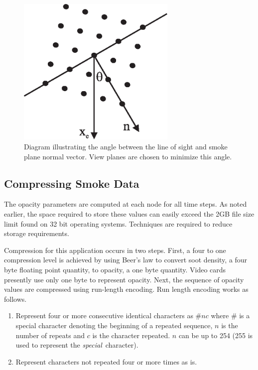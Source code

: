 \documentclass[11pt,twoside]{book}
\begin{document}
\begin{figure}
\centerline{\includegraphics[width=3.0in]{figures/figDIRB}}
\caption{Diagram illustrating the angle between the line of sight
and smoke plane normal vector.  View planes are chosen to minimize
this angle.} \label{figDIRB}
\end{figure}

%
%

\subsection{Compressing Smoke Data}

The opacity parameters are computed at each node for all time
steps. As noted earlier, the space required to store these values can easily exceed the 2GB file size limit found on 32
bit operating systems.
Techniques are required to reduce storage requirements.

Compression for this application occurs in two steps.  First, a four to one compression level is achieved by using Beer's
law to convert soot density, a four byte floating point quantity, to opacity, a one byte quantity.  Video cards presently use only one byte to represent opacity.
Next, the sequence of opacity values are compressed using run-length encoding.
Run length encoding works as follows.

\begin{enumerate}
\item Represent four or more consecutive identical characters as $\# n c$
where $\#$ is a special character denoting the beginning of a
repeated sequence, $n$ is the number of repeats and $c$ is the
character repeated.  $n$ can be up to 254 (255 is used to represent the {\em special}\ character).
\item Represent characters not repeated four or more times as is.
\end{enumerate}
\end{document}
